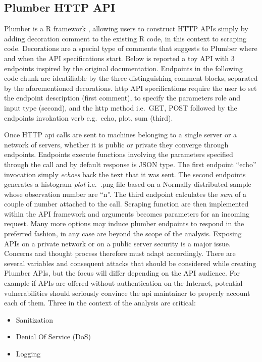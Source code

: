 \documentclass[
  12pt,
  a4paper,
  oneside]{book}
\providecommand{\tightlist}{%
  \setlength{\itemsep}{0pt}\setlength{\parskip}{0pt}}
\theoremstyle{definition}
\theoremstyle{definition}
\theoremstyle{definition}
\theoremstyle{remark}
\begin{document}
\hypertarget{plumberapi}{%
\subsection{Plumber HTTP API}\label{plumberapi}}

Plumber is a R framework \citep{plumber}, allowing users to construct HTTP APIs simply by adding decoration comment to the existing R code, in this context to scraping code. Decorations are a special type of comments that suggests to Plumber where and when the API specifications start. Below is reported a toy API with 3 endpoints inspired by the original documentation. Endpoints in the following code chunk are identifiable by the three distinguishing comment blocks, separated by the aforementioned decorations. http API specifications require the user to set the endpoint description (first comment), to specify the parameters role and input type (second), and the http method i.e.~GET, POST followed by the endpoints invokation verb e.g.~echo, plot, sum (third).

Once HTTP api calls are sent to machines belonging to a single server or a network of servers, whether it is public or private they converge through endpoints. Endpoints execute functions involving the parameters specified through the call and by default response is JSON type. The first endpoint ``echo'' invocation simply \emph{echoes} back the text that it was sent. The second endpoints generates a histogram \emph{plot} i.e.~.png file based on a Normally distributed sample whose observation number are ``n''. The third endpoint calculates the \emph{sum} of a couple of number attached to the call. Scraping function are then implemented within the API framework and arguments becomes parameters for an incoming request. Many more options may induce plumber endpoints to respond in the preferred fashion, in any case are beyond the scope of the analysis.
Exposing APIs on a private network or on a public server security is a major issue. Concerns and thought process therefore must adapt accordingly. There are several variables and consequent attacks that should be considered while creating Plumber APIs, but the focus will differ depending on the API audience. For example if APIs are offered without authentication on the Internet, potential vulnerabilities should seriously convince the api maintainer to properly account each of them. Three in the context of the analysis are critical:

\begin{itemize}
\tightlist
\item
  Sanitization
\item
  Denial Of Service (DoS)
\item
  Logging
\end{itemize}
\end{document}
